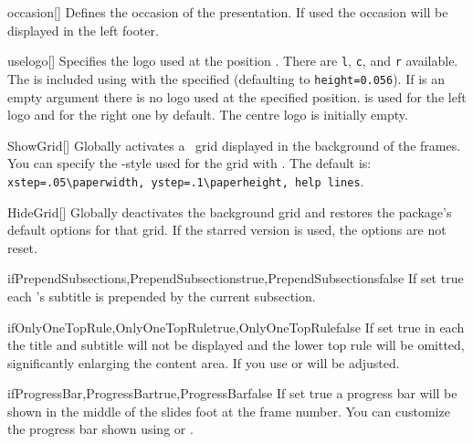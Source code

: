 \begin{describemacro}{occasion}[]
  Defines the occasion of the presentation. If used the occasion will be
  displayed in the left footer.
\end{describemacro}

\begin{describemacro}{uselogo}[]
  Specifies the logo used at the position . There are \texttt{l},
  \texttt{c}, and \texttt{r} available. The  is included using
   with the specified  (defaulting to
  \texttt{height=0.056}). If  is an empty argument
  there is no logo used at the specified position. 
  is used for the left logo and  for the right one
  by default. The centre logo is initially empty.
\end{describemacro}

\begin{describemacro}{ShowGrid}[]
  Globally activates a \TikZ\ grid displayed in the background of the frames.
  You can specify the \TikZ-style used for the grid with . The
  default is: \verb|xstep=.05\paperwidth, ystep=.1\paperheight, help lines|.
\end{describemacro}

\begin{describemacro}{HideGrid}[\meta{*}]
  Globally deactivates the background grid and restores the package's default
  options for that grid. If the starred version is used, the options are not
  reset.
\end{describemacro}

\begin{describemacro}
  {ifPrependSubsections,PrependSubsectionstrue,PrependSubsectionsfalse}
  If set true each 's subtitle is prepended by the current
  subsection.
\end{describemacro}

\begin{describemacro}{ifOnlyOneTopRule,OnlyOneTopRuletrue,OnlyOneTopRulefalse}
  If set true in each  the title and subtitle will not be displayed
  and the lower top rule will be omitted, significantly enlarging the content
  area. If you use  or 
   will be adjusted.
\end{describemacro}

\begin{describemacro}{ifProgressBar,ProgressBartrue,ProgressBarfalse}
  If set true a progress bar will be shown in the middle of the slides foot at
  the frame number. You can customize the progress bar shown using
   or .
\end{describemacro}

